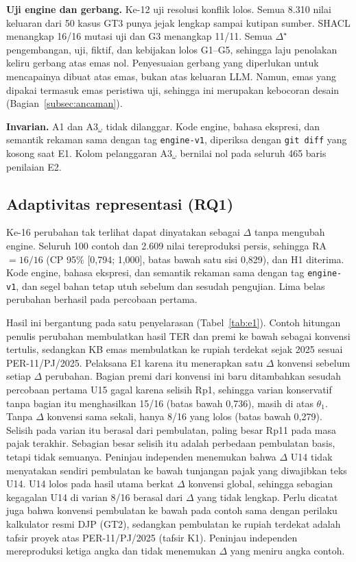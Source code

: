 \documentclass[journal,a4paper]{IEEEtran}
\makeatletter
\DeclareRobustCommand{\en}[1]{{\usefont{\f@encoding}{\f@family}{\f@series}{it}#1\/}}
\newcommand{\emas}{\star}
\makeatother
\begin{document}
\textbf{Uji \en{engine} dan gerbang.} Ke-12 uji resolusi konflik lolos. Semua 8.310 nilai keluaran dari 50 kasus GT3 punya jejak lengkap sampai kutipan sumber. SHACL menangkap 16/16 mutasi uji dan G3 menangkap 11/11. Semua $\Delta^{\emas}$ pengembangan, uji, fiktif, dan kebijakan lolos G1--G5, sehingga laju penolakan keliru gerbang atas emas nol. Penyesuaian gerbang yang diperlukan untuk mencapainya dibuat atas emas, bukan atas keluaran LLM. Namun, emas yang dipakai termasuk emas peristiwa uji, sehingga ini merupakan kebocoran desain (Bagian~\ref{subsec:ancaman}).

\textbf{Invarian.} A1 dan A3$_\omega$ tidak dilanggar. Kode \en{engine}, bahasa ekspresi, dan semantik rekaman sama dengan \en{tag} \texttt{engine-v1}, diperiksa dengan \texttt{git diff} yang kosong saat E1. Kolom pelanggaran A3$_\omega$ bernilai nol pada seluruh 465 baris penilaian E2.

\subsection{Adaptivitas representasi (RQ1)}
\label{subsec:hasil-rq1}
Ke-16 perubahan tak terlihat dapat dinyatakan sebagai $\Delta$ tanpa mengubah \en{engine}. Seluruh 100 contoh dan 2.609 nilai tereproduksi persis, sehingga RA $= 16/16$ (CP 95\% [0,794; 1,000], batas bawah satu sisi 0,829), dan H1 diterima. Kode \en{engine}, bahasa ekspresi, dan semantik rekaman sama dengan \en{tag} \texttt{engine-v1}, dan segel bahan tetap utuh sebelum dan sesudah pengujian. Lima belas perubahan berhasil pada percobaan pertama.

Hasil ini bergantung pada satu penyelarasan (Tabel~\ref{tab:e1}). Contoh hitungan penulis perubahan membulatkan hasil TER dan premi ke bawah sebagai konvensi tertulis, sedangkan KB emas membulatkan ke rupiah terdekat sejak 2025 sesuai PER-11/PJ/2025. Pelaksana E1 karena itu menerapkan satu $\Delta$ konvensi sebelum setiap $\Delta$ perubahan. Bagian premi dari konvensi ini baru ditambahkan sesudah percobaan pertama U15 gagal karena selisih Rp1, sehingga varian konservatif tanpa bagian itu menghasilkan 15/16 (batas bawah 0,736), masih di atas $\theta_1$. Tanpa $\Delta$ konvensi sama sekali, hanya 8/16 yang lolos (batas bawah 0,279). Selisih pada varian itu berasal dari pembulatan, paling besar Rp11 pada masa pajak terakhir. Sebagian besar selisih itu adalah perbedaan pembulatan basis, tetapi tidak semuanya. Peninjau independen menemukan bahwa $\Delta$ U14 tidak menyatakan sendiri pembulatan ke bawah tunjangan pajak yang diwajibkan teks U14. U14 lolos pada hasil utama berkat $\Delta$ konvensi global, sehingga sebagian kegagalan U14 di varian 8/16 berasal dari $\Delta$ yang tidak lengkap. Perlu dicatat juga bahwa konvensi pembulatan ke bawah pada contoh sama dengan perilaku kalkulator resmi DJP (GT2), sedangkan pembulatan ke rupiah terdekat adalah tafsir proyek atas PER-11/PJ/2025 (tafsir K1). Peninjau independen mereproduksi ketiga angka dan tidak menemukan $\Delta$ yang meniru angka contoh.
\end{document}

